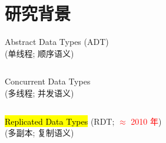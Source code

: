 
\section{研究背景}

\begin{frame}{}
  \begin{center}
    {\large Abstract Data Types {(\small \textsc{ADT})}}  \\[8pt]

    (单线程; 顺序语义)
  \end{center}

  \begin{columns}
    \pause
  \end{columns}
\end{frame}

\begin{frame}{}
  \begin{center}
    {\large Concurrent Data Types}  \\[8pt]

    (多线程; 并发语义)
  \end{center}

  \begin{columns}
    \pause
  \end{columns}
\end{frame}

\begin{frame}{}
  \begin{center}
    \hl{\large Replicated Data Types} {\small (\textsc{RDT}; \textcolor{red}{$\approx$ 2010 年})}  \\[8pt]

    (多副本; 复制语义)
  \end{center}

  \vspace{0.30cm}
\end{frame}

